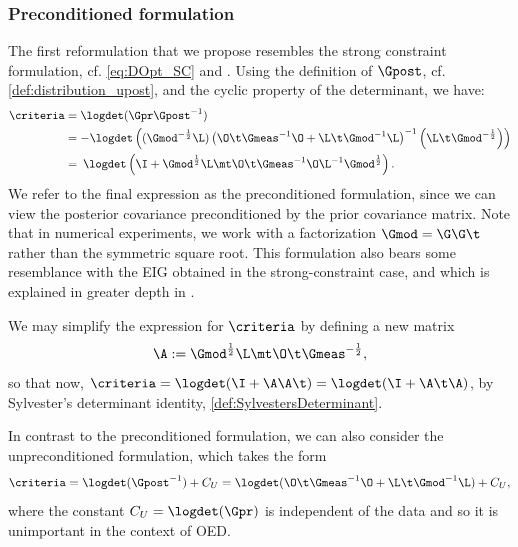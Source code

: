 \documentclass{aims} %
\theoremstyle{definition}
\begin{document}
\subsubsection{Preconditioned formulation}\label{ssec:stronglike}
The first reformulation that we propose resembles the strong constraint formulation, cf. \eqref{eq:DOpt_SC} and \cite[Section 3]{Alen}.  Using the definition of $\Gpost$, cf. \eqref{def:distribution_upost}, and the cyclic property of the determinant, we have:
%
%
\begin{align}
\begin{aligned}
\criteria
& = \logdet(\Gpr\Gpost^{-1})\\
&=-\logdet \left( (\Gmod^{-\frac 12}\L)\left( \O\t \Gmeas^{-1} \O +  \L\t \Gmod^{-1} \L \right)^{-1}
                  \left(\L\t \Gmod^{-\frac 12}  \right) \right)\\
&=\> \logdet  \left( \I  + 
\Gmod^{\frac{1}{2}} \L\mt \O\t \Gmeas^{-1}\O
\L^{-1} \Gmod^{\frac{1}{2}}   \right).
\end{aligned}\label{eq:Stable_D-optimality}
\end{align}
We refer to the final expression as the preconditioned formulation, since we can view the posterior covariance preconditioned by the prior covariance matrix. Note that in numerical experiments, we work with a factorization $\Gmod = \G\G\t$ rather than the symmetric square root.
%
This formulation also bears some resemblance with the EIG obtained in the strong-constraint case, and which is explained in greater depth in . 

We may simplify the expression for $\criteria$ by defining a new matrix 
\begin{equation}\label{def:A}
\A := \Gmod^{\frac{1}{2}}\L\mt \O\t  \Gmeas^{-\frac 12},
\end{equation}
so that now, $\criteria =\logdet(\I + \A\A\t) = \logdet(\I + \A\t\A)$, by Sylvester's determinant identity, \eqref{def:SylvestersDeterminant}.


In contrast to the preconditioned formulation, we can also consider the unpreconditioned formulation, which takes the form 
\begin{equation}\label{eqn:unprec}
    \criteria =  \logdet(\Gpost^{-1})   + C_U  = \logdet(\O\t \Gmeas^{-1} \O +  \L\t \Gmod^{-1} \L)  + C_U , 
\end{equation}
where the constant $C_U = \logdet(\Gpr)$ is independent of the data and so it is unimportant in the context of OED. 
\end{document}
